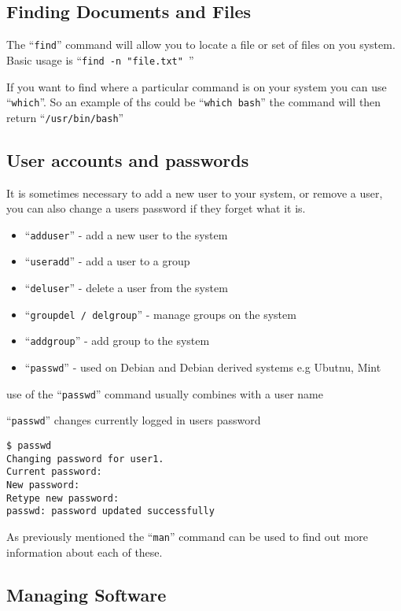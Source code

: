 \documentclass{extbook}
\begin{document}
\subsection{Finding Documents and Files}

The ``\verb|find|'' command will allow you to locate a file or set of files on you system.  Basic usage is ``\verb|find -n "file.txt" |''

If you want to find where a particular command is on your system you can use ``\verb|which|''.  So an example of ths could be ``\verb|which bash|'' the command will then return ``\verb|/usr/bin/bash|''

\subsection{User accounts and passwords}

It is sometimes necessary to add a new user to your system, or remove a user, you can also change a users password if they forget what it is.

\begin{itemize}
\item ``\verb|adduser|'' - add a new user to the system
\item ``\verb|useradd|'' - add a user to a group
\item ``\verb|deluser|'' - delete a user from the system
\item ``\verb|groupdel / delgroup|'' - manage groups on the system
\item ``\verb|addgroup|'' - add group to the system
\item ``\verb|passwd|'' - used on Debian and Debian derived systems e.g Ubutnu, Mint
\end{itemize}

use of the ``\verb|passwd|'' command usually combines with a user name

\item ``\verb|passwd|'' changes currently logged in users password

\begin{verbatim}
$ passwd
Changing password for user1.
Current password: 
New password: 
Retype new password: 
passwd: password updated successfully
\end{verbatim}

As previously mentioned the ``\verb|man|'' command can be used to find out more information about each of these. 

\subsection{Managing Software}
\end{document}
